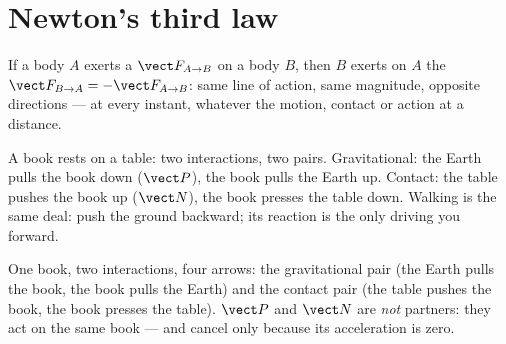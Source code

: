 \section{Newton's third law}

\begin{theorem}\label{thm:g12:newtons-laws:third}
If a body $A$ exerts a  $\vect F_{A \to B}$ on a body $B$, then $B$ exerts on
$A$ the  $\vect F_{B \to A} = -\vect F_{A \to B}$: same line of action, same
magnitude, opposite directions --- at every instant, whatever the motion, contact or
action at a distance.
\end{theorem}
\admitted

\begin{example}\label{ex:g12:newtons-laws:book}
A book rests on a table: two interactions, two pairs. Gravitational: the Earth pulls
the book down ($\vect P$), the book pulls the Earth up. Contact: the table pushes
the book up ($\vect N$), the book presses the table down. Walking is the same deal:
push the ground backward; its reaction is the only  driving you forward.
\end{example}

\begin{omfigure}

{\small One book, two interactions, four arrows: the gravitational pair (the Earth
pulls the book, the book pulls the Earth) and the contact pair (the table pushes the
book, the book presses the table). $\vect P$ and $\vect N$ are \emph{not} partners:
they act on the same book --- and cancel only because its acceleration is zero.}
\end{omfigure}

